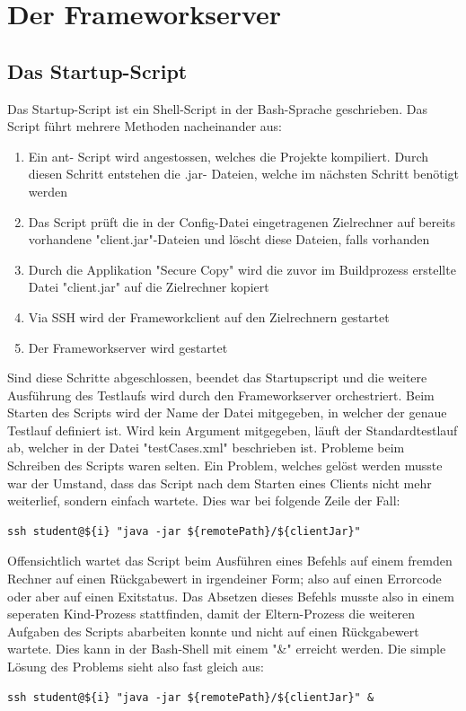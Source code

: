 \section{Der Frameworkserver}
\label{sec:test-FW Server}
\subsection{Das Startup-Script}
\label{sec:startupScript}
Das  Startup-Script ist ein Shell-Script in der Bash-Sprache geschrieben. Das Script führt mehrere Methoden nacheinander aus:
\begin{enumerate}
\item Ein ant- Script wird an\-ge\-stos\-sen, wel\-ches die Pro\-jek\-te kom\-pi\-liert. Durch die\-sen Schritt ent\-stehen die .jar- Dateien, welche im nächs\-ten Schritt benötigt werden
\item Das Script prüft die in der Config-Datei eingetragenen Zielrechner auf bereits vorhandene "client.jar"-Dateien und löscht diese Dateien, falls vorhanden
\item Durch die Applikation "Secure Copy" wird die zuvor im Buildprozess erstellte Datei "client.jar" auf die Zielrechner kopiert
\item Via SSH wird der Frameworkclient auf den Zielrechnern gestartet
\item Der Frameworkserver wird gestartet
\end{enumerate}
Sind diese Schritte abgeschlossen, beendet das Startupscript und die weitere Ausführung des Testlaufs wird durch den Frameworkserver orchestriert.
Beim Starten des Scripts wird der Name der Datei mitgegeben, in welcher der genaue Testlauf definiert ist. Wird kein Argument mitgegeben, läuft der Standardtestlauf ab, welcher in der Datei "testCases.xml" beschrieben ist.\newline
Probleme beim Schreiben des Scripts waren selten. Ein Problem, welches gelöst werden musste war der Umstand, dass das Script nach dem Starten eines Clients nicht mehr weiterlief, sondern einfach wartete. Dies war bei folgende Zeile der Fall:
\begin{lstlisting}[breaklines=true]
 ssh student@${i} "java -jar ${remotePath}/${clientJar}"
\end{lstlisting}	
Offensichtlich wartet das Script beim Ausführen eines Befehls auf einem fremden Rechner auf einen Rückgabewert in irgendeiner Form; also auf einen Errorcode oder aber auf einen Exitstatus. Das Absetzen dieses Befehls musste also in einem seperaten Kind-Prozess stattfinden, damit der Eltern-Prozess die weiteren Aufgaben des Scripts abarbeiten konnte und nicht auf einen Rückgabewert wartete. Dies kann in der Bash-Shell mit einem "\&" erreicht werden. Die simple Lösung des Problems sieht also fast gleich aus:
\begin{lstlisting}[breaklines=true]
 ssh student@${i} "java -jar ${remotePath}/${clientJar}" &
\end{lstlisting}

